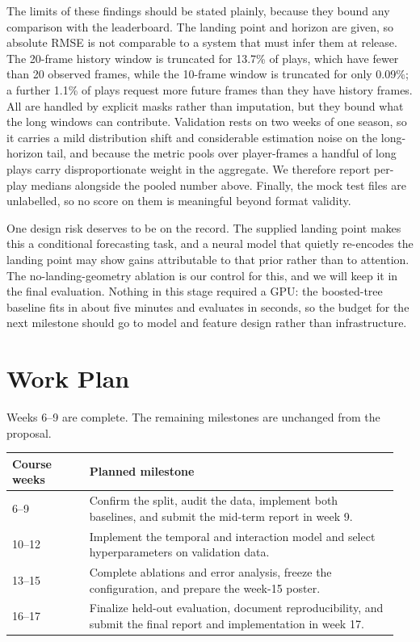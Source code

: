 \documentclass{article}
\begin{document}
The limits of these findings should be stated plainly, because they bound any
comparison with the leaderboard. The landing point and horizon are given, so absolute
RMSE is not comparable to a system that must infer them at release. The 20-frame
history window is truncated for 13.7\% of plays, which have fewer than 20 observed
frames, while the 10-frame window is truncated for only 0.09\%; a further 1.1\% of
plays request more future frames than they have history frames. All are handled by
explicit masks rather than imputation, but they bound what the long windows can
contribute. Validation rests on two weeks of one season, so it carries a mild
distribution shift and considerable estimation noise on the long-horizon tail, and
because the metric pools over player-frames a handful of long plays carry
disproportionate weight in the aggregate. We therefore report per-play medians
alongside the pooled number above. Finally, the mock test files are unlabelled, so no
score on them is meaningful beyond format validity.

One design risk deserves to be on the record. The supplied landing point makes this a
conditional forecasting task, and a neural model that quietly re-encodes the landing
point may show gains attributable to that prior rather than to attention. The
no-landing-geometry ablation is our control for this, and we will keep it in the
final evaluation. Nothing in this stage required a GPU: the boosted-tree baseline
fits in about five minutes and evaluates in seconds, so the budget for the next
milestone should go to model and feature design rather than infrastructure.

\section{Work Plan}
\label{sec:plan}

Weeks 6--9 are complete. The remaining milestones are unchanged from the proposal.

\begin{center}
\begin{tabular}{@{}p{0.19\linewidth}p{0.76\linewidth}@{}}
\toprule
Course weeks & Planned milestone \\
\midrule
6--9 & Confirm the split, audit the data, implement both baselines, and submit the mid-term report in week 9. \\
10--12 & Implement the temporal and interaction model and select hyperparameters on validation data. \\
13--15 & Complete ablations and error analysis, freeze the configuration, and prepare the week-15 poster. \\
16--17 & Finalize held-out evaluation, document reproducibility, and submit the final report and implementation in week 17. \\
\bottomrule
\end{tabular}
\end{center}
\end{document}
